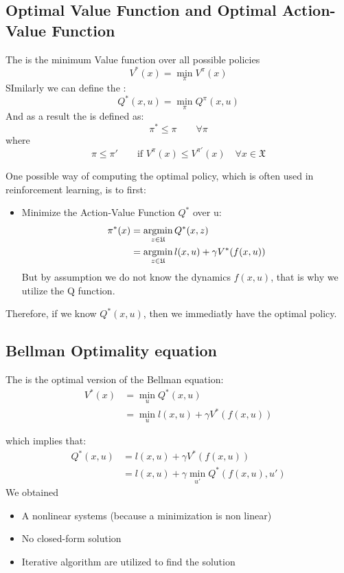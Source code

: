 \subsection{Optimal Value Function and Optimal Action-Value Function}
The  is the minimum Value function over all possible policies
\[V^*(x) = \min_{\pi}V^{\pi}(x)\]
SImilarly we can define the :
\[Q^*(x,u) = \min_{\pi}Q^{\pi}(x,u)\]
And as a result the  is defined as:
\[\pi^* \le \pi \qquad \forall \pi\]
where
\[\pi\le\pi'\qquad\text{if } V^{\pi}(x) \le V^{\pi'}(x)\quad \forall x \in \mathfrak{X}\]

One possible way of computing the optimal policy, which is often used in reinforcement learning, is to first:
\begin{itemize}
\item Minimize the Action-Value Function $Q^*$ over u:
\begin{align*}
\pi^*(x) &= \operatorname*{argmin}_{z\in\mathfrak{U}}Q^*(x,z)\\
&= \operatorname*{argmin}_{z\in\mathfrak{U}} l(x,u) + \gamma V^*(f(x,u))
\end{align*}
But by assumption we do not know the dynamics $f(x,u)$, that is why we utilize the Q function.
\end{itemize}

Therefore, if we know $Q^*(x,u)$, then we immediatly have the optimal policy.

\subsection{Bellman Optimality equation}
The  is the optimal version of the Bellman equation:
\begin{align*}
V^*(x) &= \min_u Q^*(x,u)\\
&= \min_u l(x,u) + \gamma V^*(f(x,u))
\end{align*}

which implies that:
\begin{align*}
Q^*(x,u)&=l(x,u) + \gamma V^*(f(x,u))\\
&= l(x,u) + \gamma \min_{u'} Q^*(f(x,u),u')
\end{align*}
We obtained
\begin{itemize}
\item A nonlinear systems (because a minimization is non linear)
\item No closed-form solution
\item Iterative algorithm are utilized to find the solution
\end{itemize}























